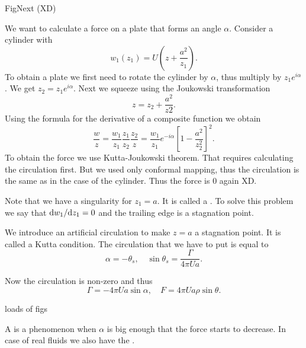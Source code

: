 \documentclass[11pt,oneside]{book}
\theoremstyle{definition} %
\theoremstyle{plain} %
\theoremstyle{remark} %
\theoremstyle{underline}
\begin{document}
  \todo FigNext (XD)

  We want to calculate a force on a plate that forms an angle $\alpha$.
  Consider a cylinder with
  \begin{displaymath}
    w_1(z_1) = U\left(z + \frac{a^2}{z_1}\right).
  \end{displaymath}
  To obtain a plate we first need to rotate the cylinder by $\alpha$, thus multiply by $z_1e^{i \alpha}$.
  We get $z_2 = z_1 e^{i\alpha}$. Next we squeeze using the Joukowski transformation
  \begin{displaymath}
    z = z_2 + \frac{a^2}{z2}.
  \end{displaymath}
  Using the formula for the derivative of a composite function we obtain
  \begin{displaymath}
    \dfrac{w}{z} = \dfrac{w_1}{z_1} \dfrac{z_1}{z_2}\dfrac{z_2}{z} = \dfrac{w_1}{z_1} e^{-i\alpha} \left[ 1 - \frac{a^2}{z_2^2} \right]^2.
  \end{displaymath}
  To obtain the force we use Kutta-Joukowski theorem.
  That requires calculating the circulation first.
  But we used only conformal mapping, thus the circulation is the same as in the case of the cylinder.
  Thus the force is 0 again XD.

  Note that we have a singularity for $z_1 = a$. 
  It is called a .
  To solve this problem we say that $\mathrm{d} w_1/ \mathrm{d} z_1 = 0$ and the trailing edge is a stagnation point.
  
  We introduce an artificial circulation to make $z = a$ a stagnation point.
  It is called a Kutta condition.
  The circulation that we have to put is equal to 
  \begin{displaymath}
    \alpha = - \theta_s, \quad \sin \theta_s = \frac{\Gamma}{4 \pi U a}.
  \end{displaymath}

  Now the circulation is non-zero and thus
  \begin{displaymath}
    \Gamma = -4\pi U a \sin \alpha, \quad F = 4 \pi U a \rho \sin \theta.
  \end{displaymath}
  
  \todo loads of figs
  
  A  is a phenomenon when $\alpha$ is big enough that the force starts to decrease.
  In case of real fluids we also have the .


  
  

  

  
  
  
  
  
  
  
  
  
  
  
  

  
  
  
  

  
  
  
  
  
  
  
  
  

  

  
\end{document}

